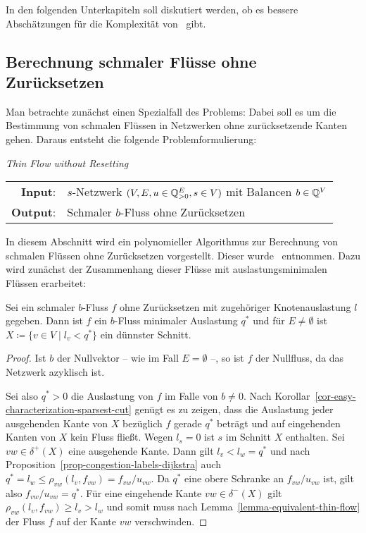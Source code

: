 In den folgenden Unterkapiteln soll diskutiert werden, ob es bessere Abschätzungen für die Komplexität von \probTFwR\ gibt.

\subsection{Berechnung schmaler Flüsse ohne Zurücksetzen}

Man betrachte zunächst einen Spezialfall des Problems:
Dabei soll es um die Bestimmung von schmalen Flüssen in Netzwerken ohne zurücksetzende Kanten gehen.
Daraus entsteht die folgende Problemformulierung:

\begin{center}
	\begin{mdframed}
		\centering
		\emph{Thin Flow without Resetting \probTFwoR} \\[1em]
		\begin{tabular}{rl}
			{\bfseries Input}: &$s$-Netzwerk $(V, E, u \in \mathbb{Q}^E_{>0}, s\in V)$ mit Balancen $b\in\mathbb{Q}^V$\\
			{\bfseries Output}: &Schmaler $b$-Fluss ohne Zurücksetzen
		\end{tabular}
	\end{mdframed}
\end{center}

In diesem Abschnitt wird ein polynomieller Algorithmus zur Berechnung von schmalen Flüssen ohne Zurücksetzen vorgestellt.
Dieser wurde~\cite{Koch2012} entnommen.
Dazu wird zunächst der Zusammenhang dieser Flüsse mit auslastungsminimalen Flüssen erarbeitet:

\begin{lemma}\label{lemma-thin-flows-without-resetting-have-minimal-congestion}
	Sei ein schmaler $b$-Fluss $f$ ohne Zurücksetzen mit zugehöriger Knotenauslastung $l$ gegeben.
	Dann ist $f$ ein $b$-Fluss minimaler Auslastung $q^*$ und für $E\neq\emptyset$ ist $X\coloneq \{ v\in V \mid l_v < q^* \}$ ein dünnster Schnitt.
\end{lemma}
\begin{proof}
	Ist $b$ der Nullvektor -- wie im Fall $E=\emptyset$ --, so ist $f$ der Nullfluss, da das Netzwerk azyklisch ist.
	
	Sei also $q^*>0$ die Auslastung von $f$ im Falle von $b\neq 0$.
	Nach Korollar~\ref{cor-easy-characterization-sparsest-cut} genügt es zu
	zeigen, dass die Auslastung jeder ausgehenden Kante von $X$ bezüglich $f$ gerade $q^*$ beträgt und auf eingehenden Kanten von $X$ kein Fluss fließt.
	Wegen $l_s=0$ ist $s$ im Schnitt $X$ enthalten.
	Sei $vw\in\delta^+(X)$ eine ausgehende Kante.
	Dann gilt $l_v < l_w = q^* $ und nach Proposition~\ref{prop-congestion-labels-dijkstra} auch $q^* = l_w \leq \rho_{vw}(l_v, f_{vw}) = f_{vw} / u_{vw}$.
	Da $q^*$ eine obere Schranke an $f_{vw}/u_{vw}$ ist, gilt also $f_{vw}/u_{vw} = q^*$.
	Für eine eingehende Kante $vw\in\delta^-(X)$ gilt $\rho_{vw}(l_v, f_{vw})\geq l_v > l_w$ und somit muss nach Lemma~\ref{lemma-equivalent-thin-flow} der Fluss $f$ auf der Kante $vw$ verschwinden.
\end{proof}

